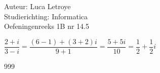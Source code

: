 \documentclass[a4paper]{article}
\begin{document}
  
\noindent \large Auteur: Luca Letroye \\
\noindent \large Studierichting: Informatica\\
\noindent \large Oefeningenreeks 1B nr 14.5\\

\medskip

\normalsize

$\dfrac{2+i}{3-i} = \dfrac{(6-1)+(3+2)i}{9+1} = \dfrac{5+5i}{10} = \dfrac{1}{2}+ \dfrac{1}{2}i$



\begin{thebibliography}{999}
\end{thebibliography}
\end{document}
